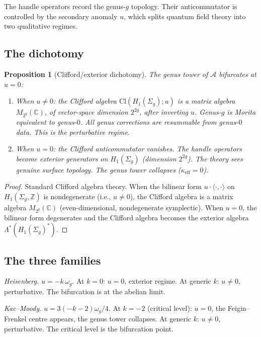 \documentclass[11pt,reqno]{amsart}
\newtheorem{proposition}[theorem]{Proposition}
\theoremstyle{definition}
\theoremstyle{remark}
\newcommand{\cA}{\mathcal{A}}
\newcommand{\bC}{\mathbb{C}}
\newcommand{\bZ}{\mathbb{Z}}
\numberwithin{equation}{section}
\begin{document}
The handle operators record the genus-$g$ topology. Their
anticommutator is controlled by the secondary anomaly $u$, which
splits quantum field theory into two qualitative regimes.


\subsection{The dichotomy}\label{subsec:dichotomy}

\begin{proposition}[Clifford/exterior dichotomy]
\label{prop:dichotomy}
The genus tower of $\cA$ bifurcates at $u = 0$:
\begin{enumerate}[label=(\roman*),nosep]
\item When $u \neq 0$: the Clifford algebra
  $\mathrm{Cl}(H_1(\Sigma_g); u)$ is a matrix algebra
  \(M_{2^g}(\bC)\), of vector-space dimension \(2^{2g}\), after
  inverting \(u\). Genus-$g$ is Morita equivalent to
  genus-$0$. All genus corrections are resummable from genus-$0$
  data. This is the perturbative regime.
\item When $u = 0$: the Clifford anticommutator vanishes. The
  handle operators become exterior generators on $H_1(\Sigma_g)$
  (dimension $2^{2g}$). The theory sees genuine surface topology.
  The genus tower collapses ($\kappa_{\mathrm{eff}} = 0$).
\end{enumerate}
\end{proposition}

\begin{proof}
Standard Clifford algebra theory. When the bilinear form
$u \cdot \langle\cdot,\cdot\rangle$ on $H_1(\Sigma_g, \bZ)$ is
nondegenerate (i.e., $u \neq 0$), the Clifford algebra is a
matrix algebra $M_{2^g}(\bC)$ (even-dimensional, nondegenerate
symplectic). When $u = 0$, the bilinear form degenerates and the
Clifford algebra becomes the exterior algebra
$\Lambda^*(H_1(\Sigma_g)^*)$.
\end{proof}


\subsection{The three families}\label{subsec:anomaly-families}

\noindent\emph{Heisenberg.}\enspace
$u = -k\,\omega_g$. At $k = 0$: $u = 0$, exterior regime. At
generic $k$: $u \neq 0$, perturbative. The bifurcation is at the
abelian limit.

\smallskip
\noindent\emph{Kac--Moody.}\enspace
$u = 3(-k-2)\omega_g/4$. At $k = -2$ (critical level): $u = 0$,
the Feigin--Frenkel centre appears, the genus tower collapses. At
generic $k$: $u \neq 0$, perturbative. The critical level is
the bifurcation point.
\end{document}
